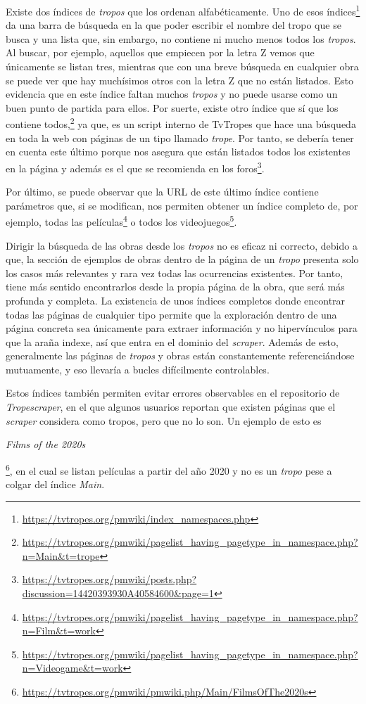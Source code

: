 Existe dos índices de \textit{tropos} que los ordenan alfabéticamente. Uno de
esos índices\footnote{\url{https://tvtropes.org/pmwiki/index_namespaces.php}} da
una barra de búsqueda en la que poder escribir el nombre del tropo que se busca
y una lista que, sin embargo, no contiene ni mucho menos todos los
\textit{tropos}. Al buscar, por ejemplo, aquellos que empiecen por la letra Z
vemos que únicamente se listan tres, mientras que con una breve búsqueda en
cualquier obra se puede ver que hay muchísimos otros con la letra Z que no están
listados. Esto evidencia que en este índice faltan muchos \textit{tropos} y no
puede usarse como un buen punto de partida para ellos. Por suerte, existe otro
índice que sí que los contiene
todos,\footnote{\url{https://tvtropes.org/pmwiki/pagelist_having_pagetype_in_namespace.php?n=Main&t=trope}}
ya que, es un script interno de TvTropes que hace una búsqueda en toda la web
con páginas de un tipo llamado \textit{trope}. Por tanto, se debería tener en
cuenta este último porque nos asegura que están listados todos los existentes en
la página y además es el que se recomienda en los
foros\footnote{\url{https://tvtropes.org/pmwiki/posts.php?discussion=14420393930A40584600&page=1}}.

Por último, se puede observar que la URL de este último índice contiene
parámetros que, si se modifican, nos permiten obtener un índice completo de, por
ejemplo, todas las
películas\footnote{\url{https://tvtropes.org/pmwiki/pagelist_having_pagetype_in_namespace.php?n=Film&t=work}}
o todos los
videojuegos\footnote{\url{https://tvtropes.org/pmwiki/pagelist_having_pagetype_in_namespace.php?n=Videogame&t=work}}.

Dirigir la búsqueda de las obras desde los \textit{tropos} no es eficaz ni
correcto, debido a que, la sección de ejemplos de obras dentro de la página de
un \textit{tropo} presenta solo los casos más relevantes y rara vez todas las
ocurrencias existentes. Por tanto, tiene más sentido encontrarlos desde la
propia página de la obra, que será más profunda y completa. La existencia de
unos índices completos donde encontrar todas las páginas de cualquier tipo
permite que la exploración dentro de una página concreta sea únicamente para
extraer información y no hipervínculos para que la araña indexe, así que entra
en el dominio del \textit{scraper}. Además de esto, generalmente las páginas de
\textit{tropos} y obras están constantemente referenciándose mutuamente, y eso
llevaría a bucles difícilmente controlables.

Estos índices también permiten evitar errores observables en el repositorio de
\textit{Tropescraper}, en el que algunos usuarios reportan que existen páginas
que el \textit{scraper} considera como tropos, pero que no lo son. Un ejemplo de
esto es \begin{otherlanguage}{english}\textit{Films of the
2020s}\end{otherlanguage}\footnote{\url{https://tvtropes.org/pmwiki/pmwiki.php/Main/FilmsOfThe2020s}},
en el cual se listan películas a partir del año 2020 y no es un \textit{tropo}
pese a colgar del índice \textit{Main}.

